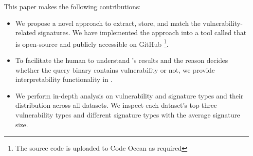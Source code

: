 This paper makes the following contributions:
\begin{itemize}
  \item We propose a novel approach to extract, store, and match the vulnerability-related signatures. 
  We have implemented the approach into a tool called \name that is open-source and publicly accessible on GitHub \footnote{{The source code is uploaded to Code Ocean as required}}.
  \item To facilitate the human to understand \name's results and the reason \name decides whether the query binary contains vulnerability or not, we provide interpretability functionality in \name.
  \item We perform in-depth analysis on vulnerability and signature types and their distribution across all datasets. 
  We inspect each dataset's top three vulnerability types and different signature types with the average signature size.
\end{itemize}

